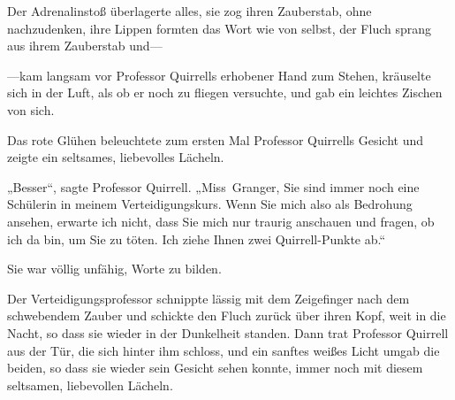 
Der Adrenalinstoß überlagerte alles, sie zog ihren Zauberstab, ohne nachzudenken, ihre Lippen formten das Wort wie von selbst, der Fluch sprang aus ihrem Zauberstab und—

—kam langsam vor Professor Quirrells erhobener Hand zum Stehen, kräuselte sich in der Luft, als ob er noch zu fliegen versuchte, und gab ein leichtes Zischen von sich.

Das rote Glühen beleuchtete zum ersten Mal Professor Quirrells Gesicht und zeigte ein seltsames, liebevolles Lächeln.

„Besser“, sagte Professor Quirrell. „Miss~Granger, Sie sind immer noch eine Schülerin in meinem Verteidigungskurs. Wenn Sie mich also als Bedrohung ansehen, erwarte ich nicht, dass Sie mich nur traurig anschauen und fragen, ob ich da bin, um Sie zu töten. Ich ziehe Ihnen zwei Quirrell-Punkte ab.“

Sie war völlig unfähig, Worte zu bilden.

Der Verteidigungsprofessor schnippte lässig mit dem Zeigefinger nach dem schwebendem Zauber und schickte den Fluch zurück über ihren Kopf, weit in die Nacht, so dass sie wieder in der Dunkelheit standen. Dann trat Professor Quirrell aus der Tür, die sich hinter ihm schloss, und ein sanftes weißes Licht umgab die beiden, so dass sie wieder sein Gesicht sehen konnte, immer noch mit diesem seltsamen, liebevollen Lächeln.

